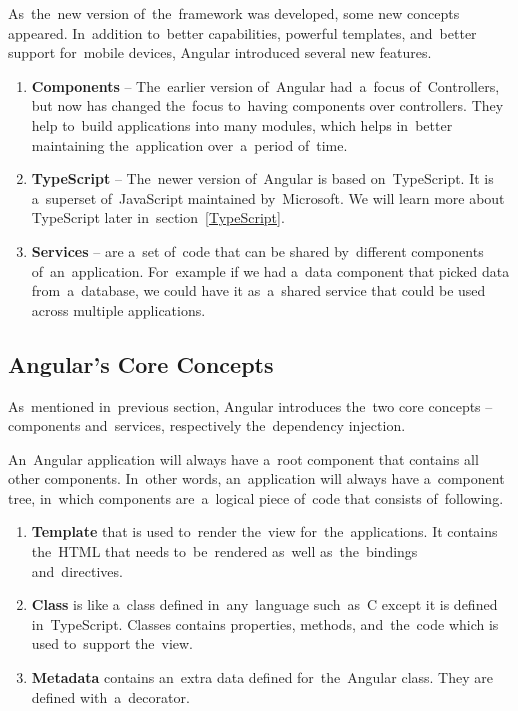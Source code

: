As~the~new version of~the~framework was developed, some new concepts appeared.
In~addition to~better  capabilities, powerful templates,
and~better support for~mobile devices, Angular introduced several new features.

\begin{enumerate}
  \item \textbf{Components} -- The~earlier version of~Angular had~a~focus
  of~Controllers, but now has changed the~focus to~having components over
  controllers. They help to~build applications into many modules, which
  helps in~better maintaining the~application over~a~period of~time.
  \item \textbf{TypeScript} -- The~newer version of~Angular is based
  on~TypeScript. It is a~superset of~JavaScript maintained by~Microsoft. We will
  learn more about TypeScript later in~section~\ref{TypeScript}.
  \item \textbf{Services} -- are a~set of~code that can be shared by~different
  components of~an~application. For~example if we had a~data component that
  picked data from~a~database, we could have it as~a~shared service that could
  be used across multiple applications.
\end{enumerate}

\subsection{Angular's Core Concepts}
As~mentioned in~previous section, Angular introduces the~two core concepts --
components and~services, respectively the~dependency injection.

An~Angular application will always have a~root component that contains all other
components. In~other words, an~application will always have a~component tree,
in~which components are~a~logical piece of~code that consists of~following.

\begin{enumerate}
  \item \textbf{Template} that is used to~render the~view for~the~applications.
  It contains the~HTML that needs to~be~rendered as~well as~the~bindings
  and~directives.
  \item \textbf{Class} is like a~class defined in~any~language such~as~C except
  it is defined in~TypeScript. Classes contains properties, methods,
  and~the~code which is used to~support the~view.
  \item \textbf{Metadata} contains an~extra data defined for~the~Angular class.
  They are defined with~a~decorator.
\end{enumerate}

